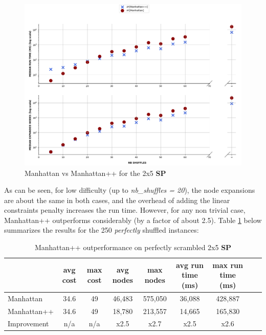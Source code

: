 \begin{figure}[H]
\centering
\includegraphics[scale=0.40]{./Figures/25SPPerformanceManhattan}
\caption[SP]{Manhattan vs Manhattan++ for the 2x5 \textbf{SP}}
\label{fig:25SPPerformanceManhattan}
\end{figure}

As can be seen, for low difficulty (up to \textit{nb\_shuffles = 20}), the node expansions are about the same in both cases, and the overhead of adding the linear constraints penalty increases the run time. However, for any non trivial case, Manhattan++ outperforms considerably (by a factor of about 2.5). Table \ref{tab:mppOutperformance} below summarizes the results for the 250 \textit{perfectly} shuffled instances:



\begin{table}[H]
\begin{center}
\begin{tabular}{l*{7}{c}r}
                              & avg cost  & max cost & avg nodes & max nodes & avg run time (ms) & max run time (ms) \\
\hline
Manhattan                   &  34.6  & 49 & 46,483 & 575,050 & 36,088 & 428,887 \\
Manhattan++              & 34.6 &  49 & 18,780 & 213,557 & 14,665 & 165,830 \\
Improvement               & n/a &  n/a & x2.5 & x2.7 & x2.5 & x2.6 \\
\end{tabular}
\caption{\label{tab:mppOutperformance} Manhattan++ outperformance on perfectly scrambled 2x5 \textbf{SP}}
\end{center}
\end{table}






